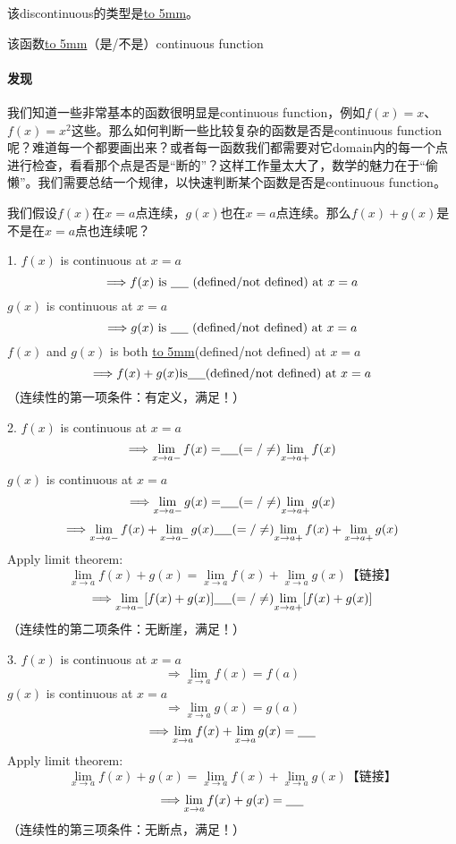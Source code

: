 \documentclass[UTF8]{ctexart}
\begin{document}
该discontinuous的类型是\underline{\hbox to 5mm{}}。

该函数\underline{\hbox to 5mm{}}（是/不是）continuous function

\paragraph{发现}
我们知道一些非常基本的函数很明显是continuous function，例如$f(x) = x$、$f(x) = x^2$这些。那么如何判断一些比较复杂的函数是否是continuous function呢？难道每一个都要画出来？或者每一函数我们都需要对它domain内的每一个点进行检查，看看那个点是否是“断的”？这样工作量太大了，数学的魅力在于“偷懒”。我们需要总结一个规律，以快速判断某个函数是否是continuous function。

我们假设$f(x)$在$x = a$点连续，$g(x)$也在$x = a$点连续。那么$f(x) + g(x)$是不是在$x = a$点也连续呢？

1. $f(x)$ is continuous at $x = a$
\[ \Longrightarrow f(x) \text{ is } \underline{\hbox to 5mm{}} \text{ (defined/not defined) at } x = a \] 
$g(x)$ is continuous at $x = a$
\[ \Longrightarrow g(x) \text{ is } \underline{\hbox to 5mm{}} \text{ (defined/not defined) at } x = a \] 
 $f(x)$ and $g(x)$ is both \underline{\hbox to 5mm{}}(defined/not defined) at $x = a$
 \[\Longrightarrow f(x)+g(x) \text{is} \underline{\hbox to 5mm{}}\text{(defined/not defined) at }x = a\]（连续性的第一项条件：有定义，满足！）

2. $f(x)$ is continuous at $x = a$
\[ \Longrightarrow {\lim_{x \to a-}f(x) =} \underline{\hbox to 5mm{}} ( = / \neq)  {\lim_{x \to a+}f(x)} \] 
$g(x)$ is continuous at $x = a$
\[ \Longrightarrow {\lim_{x \to a-}g(x) =} \underline{\hbox to 5mm{}} ( = / \neq)  {\lim_{x \to a+}g(x)} \] 
 \[\Longrightarrow {\lim_{x \to a-}f(x)} +  {\lim_{x \to a-}g(x)} \underline{\hbox to 5mm{}} ( = / \neq)  {\lim_{x \to a+}f(x)} + {\lim_{x \to a+}g(x)}\]
Apply limit theorem:
\[{\lim_{x \to a} f(x) + g(x)} = {\lim_{x \to a} f(x)}  + {\lim_{x \to a} g(x)} \text{【链接】}\]
  \[\Longrightarrow {\lim_{x \to a-}[f(x) + g(x)]}\underline{\hbox to 5mm{}} ( = / \neq)  {\lim_{x \to a+}[f(x) + g(x)]}\]
 （连续性的第二项条件：无断崖，满足！）

3. $f(x)$ is continuous at $x = a$
\[ \Longrightarrow {\lim_{x \to a}f(x)} = f(a) \] 
$g(x)$ is continuous at $x = a$
\[ \Longrightarrow {\lim_{x \to a}g(x)} = g(a) \] 
\[ \Longrightarrow {\lim_{x \to a}f(x)} + {\lim_{x \to a}g(x)} = \underline{\hbox to 5mm{}} \] 
Apply limit theorem:
\[{\lim_{x \to a} f(x) + g(x)} = {\lim_{x \to a} f(x)}  + {\lim_{x \to a} g(x)} \text{【链接】}\]
\[ \Longrightarrow {\lim_{x \to a}f(x)+g(x)} = \underline{\hbox to 5mm{}} \] 
（连续性的第三项条件：无断点，满足！）
\end{document}
